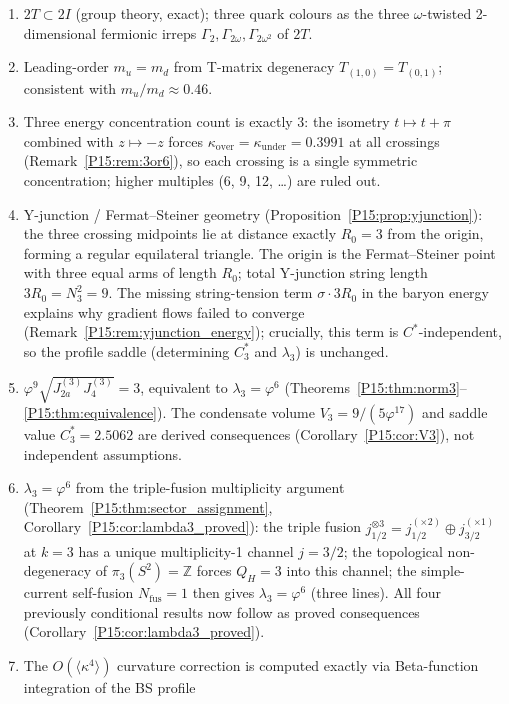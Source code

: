 \documentclass[11pt,a4paper]{article}
\theoremstyle{definition}\newtheorem{definition}[theorem]{Definition}
\theoremstyle{remark}
\newcommand{\vp}{\varphi}
\newcommand{\lam}{\lambda}
\newcommand{\Ja}{J_{2a}}
\newcommand{\Jfour}{J_4}
\newcommand{\twoI}{2I}
\newcommand{\twoT}{2T}
\newcommand{\QH}{Q_H}
\begin{document}
\begin{enumerate}[noitemsep,label=(\arabic*)]
  (topology, exact).
\item $\twoT\subset\twoI$ (group theory, exact);
  three quark colours as the three $\omega$-twisted 2-dimensional
  fermionic irreps $\Gamma_2,\Gamma_{2\omega},\Gamma_{2\omega^2}$
  of $\twoT$.
\item Leading-order $m_u=m_d$ from T-matrix degeneracy
  $T_{(1,0)}=T_{(0,1)}$; consistent with $m_u/m_d\approx0.46$.
\item Three energy concentration count is exactly $3$: the isometry
  $t\mapsto t+\pi$ combined with $z\mapsto -z$ forces
  $\kappa_{\mathrm{over}}=\kappa_{\mathrm{under}}=0.3991$ at all crossings
  (Remark~\ref{P15:rem:3or6}), so each crossing is a single symmetric
  concentration; higher multiples (6, 9, 12, \ldots) are ruled out.
\item Y-junction / Fermat--Steiner geometry (Proposition~\ref{P15:prop:yjunction}):
  the three crossing midpoints lie at distance exactly $R_0=3$ from the
  origin, forming a regular equilateral triangle.
  The origin is the Fermat--Steiner point with three equal arms of length
  $R_0$; total Y-junction string length $3R_0 = N_3^2 = 9$.
  The missing string-tension term $\sigma\cdot 3R_0$ in the baryon energy
  explains why gradient flows failed to converge (Remark~\ref{P15:rem:yjunction_energy});
  crucially, this term is $C^*$-independent, so the profile saddle
  (determining $C_3^*$ and $\lam_3$) is unchanged.
\item $\vp^9\sqrt{\Ja^{(3)}\Jfour^{(3)}}=3$, equivalent to $\lam_3=\vp^6$
  (Theorems~\ref{P15:thm:norm3}--\ref{P15:thm:equivalence}).
  The condensate volume $V_3=9/(5\vp^{17})$ and saddle value $C_3^*=2.5062$
  are derived consequences (Corollary~\ref{P15:cor:V3}), not independent assumptions.
\item $\lam_3=\vp^6$ from the triple-fusion multiplicity argument
  (Theorem~\ref{P15:thm:sector_assignment}, Corollary~\ref{P15:cor:lambda3_proved}):
  the triple fusion $j_{1/2}^{\otimes 3}=j_{1/2}^{(\times 2)}\oplus j_{3/2}^{(\times 1)}$
  at $k=3$ has a unique multiplicity-1 channel $j=3/2$;
  the topological non-degeneracy of $\pi_3(S^2)=\mathbb{Z}$
  forces $\QH=3$ into this channel;
  the simple-current self-fusion $N_{\mathrm{fus}}=1$ then gives
  $\lam_3=\vp^6$ (three lines).
  All four previously conditional results now follow as proved
  consequences (Corollary~\ref{P15:cor:lambda3_proved}).
\item The $O(\langle\kappa^4\rangle)$ curvature correction is computed
  exactly via Beta-function integration of the BS profile

\end{enumerate}
\end{document}
